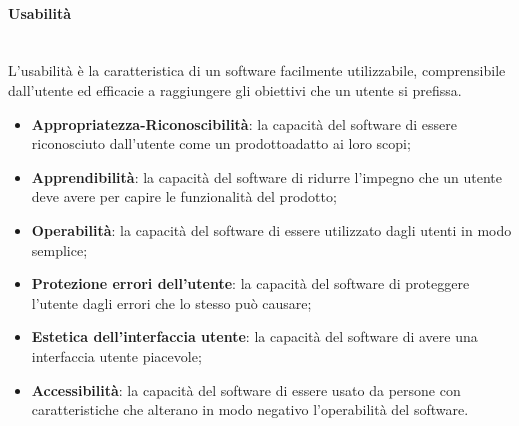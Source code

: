 	\paragraph{Usabilità} \mbox{}\\
	L'usabilità è la caratteristica di un software facilmente utilizzabile, comprensibile dall'utente ed efficacie a raggiungere gli obiettivi che un utente si prefissa.
	\begin{itemize}
		\item \textbf{Appropriatezza-Riconoscibilità}: la capacità del software di essere riconosciuto dall'utente come un prodotto\glosp adatto ai loro scopi;
		\item \textbf{Apprendibilità}: la capacità del software di ridurre l'impegno che un utente deve avere per capire le funzionalità del prodotto\glo ;
		\item \textbf{Operabilità}: la capacità del software di essere utilizzato dagli utenti in modo semplice;
		\item \textbf{Protezione errori dell'utente}: la capacità del software di proteggere l'utente dagli errori che lo stesso può causare;
		\item \textbf{Estetica dell'interfaccia utente}: la capacità del software di avere una interfaccia utente piacevole;
		\item \textbf{Accessibilità}: la capacità del software di essere usato da persone con caratteristiche che alterano in modo negativo l'operabilità del software.
	\end{itemize}
